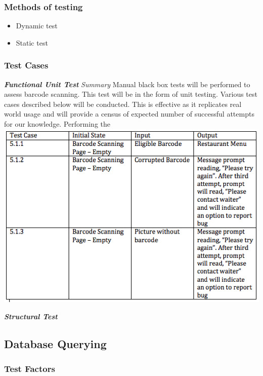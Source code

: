\documentclass[12pt]{article}
\begin{document}
\subsubsection{Methods of testing}
\begin{itemize}
  \item Dynamic test
  \item Static test
\end{itemize}

\subsubsection{Test Cases}
\textbf{\textit{Functional Unit Test}}\newline
\newline
\textit{Summary}\newline
Manual black box tests will be performed to assess barcode scanning. This test will be in the form of unit testing. Various test cases described below will be conducted. This is effective as it replicates real world usage and will provide a census of expected number of successful attempts for our knowledge. Performing the
\newline
\includegraphics{Barcode.png}\newline

\textbf{\textit{Structural Test}}\newline

\subsection{Database Querying}

\subsubsection{Test Factors}
\end{document}
